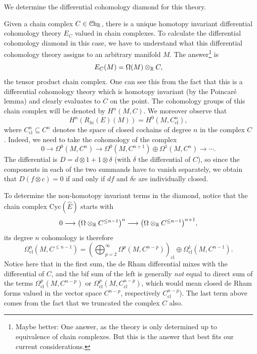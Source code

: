 \documentclass[10pt]{amsart}
\begin{document}
We determine the differential cohomology diamond for this theory.
 
 \medskip

Given a chain complex $C \in \mathcal{C}\mathrm{h}_{\mathbb{R}}$, there is a unique homotopy invariant differential cohomology theory $E_C$ valued in chain complexes. To calculate the differential cohomology diamond in this case, we have to understand what this differential cohomology theory assigns to an arbitrary manifold $M$. The answer\footnote{Maybe better: One answer, as the theory is only determined up to equivalence of chain complexes. But this is the answer that best fits our current considerations.} is
\[
E_C(M) = \Omega(M) \otimes_{\mathbb{R}} C,
\]
the tensor product chain complex. One can see this from the fact that this is a differential cohomology theory which is homotopy invariant (by the Poincar\'e lemma) and clearly evaluates to $C$ on the point. The cohomology groups of this chain complex will be denoted by $H^n(M, C)$. We moreover observe that 
\[
H^n(R_{hi}(E)(M)) = H^0(M, C^n_{\mathrm{cl}}),
\]
where $C^n_{\mathrm{cl}} \subseteq C^n$ denotes the space of closed cochains of degree $n$ in the complex $C$. Indeed, we need to take the cohomology of the complex
\[
0 \longrightarrow \Omega^0(M, C^n) \longrightarrow \Omega^0(M, C^{n+1}) \oplus \Omega^1(M, C^n) \longrightarrow \cdots.
\]
The differential is $D = d\otimes 1 + 1 \otimes \delta$ (with $\delta$ the differential of $C$), so since the components in each of the two summands have to vanish separately, we obtain that $D(f \otimes c) = 0$ if and only if $df$ and $\delta c$ are individually closed.

To determine the non-homotopy invariant terms in the diamond, notice that the chain complex $\mathrm{Cyc}(\hat{E})$ starts with
\[
0 \longrightarrow \bigl(\Omega \otimes_{\mathbb{R}} C^{\leq n-1}\bigr)^n \longrightarrow \bigl(\Omega \otimes_{\mathbb{R}} C^{\leq n-1}\bigr)^{n+1},
\]
its degree $n$ cohomology is therefore
\[
\Omega_{\mathrm{cl}}^n(M, C^{\leq n-1}) = \left(\bigoplus_{p=2}^\infty \Omega^p(M, C^{n-p})\right)_{\mathrm{cl}} \oplus \Omega^1_{\mathrm{cl}}(M, C^{n-1}).
\]
Notice here that in the first sum, the de Rham differential mixes with the differential of $C$, and the bif sum of the left is generally \emph{not} equal to direct sum of the terms $\Omega^p_{\mathrm{cl}}(M, C^{n-p})$ or $\Omega^p_{\mathrm{cl}}(M, C_{\mathrm{cl}}^{n-p})$, which would mean closed de Rham forms valued in the vector space $C^{n-p}$, respectively $C^{n-p}_{\mathrm{cl}}$).
The last term above comes from the fact that we truncated the complex $C$ also.
\end{document}

